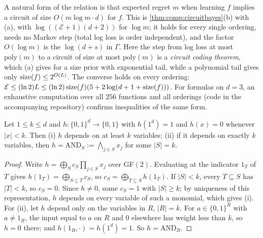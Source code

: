 \begin{remark}\label{rem:comp:gap}
A natural form of the relation is that expected regret $m$ when learning $f$ implies a circuit of size $O(m\log m\cdot d)$ for $f$. This is \cref{thm:comp:circuitbayes}(b) with (a), with $\log((\mathcal E+1)(d+2))$ for $\log m$; it holds for every single ordering, needs no Markov step (total log loss is order independent), and the factor $O(\log m)$ is the $\log(d+s)$ in $\Gamma$. Here the step from log loss at most $\mathrm{poly}(m)$ to a circuit of size at most $\mathrm{poly}(m)$ is a \emph{circuit coding theorem}, which (a) gives for a size prior with exponential tail, while a polynomial tail gives only $\operatorname{size}(f)\le2^{O(L)}$. The converse holds on every ordering: $\mathcal E\le(\ln2)L\le(\ln2)\operatorname{size}(f)(5+2\log(d+1+\operatorname{size}(f)))$. For formulas on $d=3$, an exhaustive computation over all $256$ functions and all orderings (code in the accompanying repository) confirms inequalities of the same form.
\end{remark}

\begin{lemma}\label{lem:comp:mobius}
Let $1\le k\le d$ and $h:\{0,1\}^d\to\{0,1\}$ with $h(1^d)=1$ and $h(x)=0$ whenever $|x|<k$. Then (i) $h$ depends on at least $k$ variables; (ii) if it depends on exactly $k$ variables, then $h=\mathrm{AND}_S:=\bigwedge_{j\in S}x_j$ for some $|S|=k$.
\end{lemma}

\begin{proof}
Write $h=\bigoplus_Sc_S\prod_{j\in S}x_j$ over GF$(2)$. Evaluating at the indicator $1_T$ of $T$ gives $h(1_T)=\bigoplus_{S\subseteq T}c_S$, so $c_S=\bigoplus_{T\subseteq S}h(1_T)$. If $|S|<k$, every $T\subseteq S$ has $|T|<k$, so $c_S=0$. Since $h\ne0$, some $c_S=1$ with $|S|\ge k$; by uniqueness of this representation, $h$ depends on every variable of such a monomial, which gives (i). For (ii), let $h$ depend only on the variables in $R$, $|R|=k$. For $a\in\{0,1\}^R$ with $a\ne1_R$, the input equal to $a$ on $R$ and $0$ elsewhere has weight less than $k$, so $h=0$ there; and $h(1_R,\cdot)=h(1^d)=1$. So $h=\mathrm{AND}_R$.
\end{proof}

